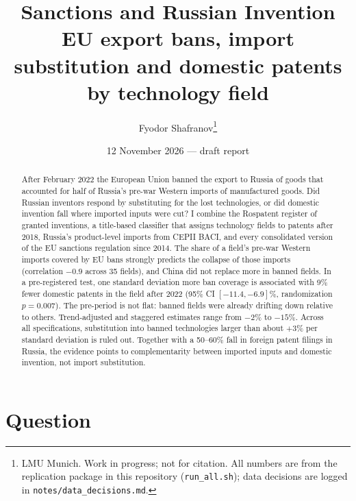 \documentclass[11pt,a4paper]{article}
\title{\textbf{Sanctions and Russian Invention}\\[0.3em]
\large EU export bans, import substitution and domestic patents by technology field}
\author{Fyodor Shafranov\thanks{LMU Munich. Work in progress; not for citation. All numbers are from the
replication package in this repository (\texttt{run\_all.sh}); data decisions are logged in
\texttt{notes/data\_decisions.md}.}}
\date{12 November 2026 --- draft report}
\begin{document}
\maketitle

\begin{abstract}
\noindent
After February 2022 the European Union banned the export to Russia of goods that accounted for half of Russia's
pre-war Western imports of manufactured goods. Did Russian inventors respond by substituting for the lost
technologies, or did domestic invention fall where imported inputs were cut? I combine the Rospatent register of
granted inventions, a title-based classifier that assigns technology fields to patents after 2018, Russia's
product-level imports from CEPII BACI, and every consolidated version of the EU sanctions regulation since 2014.
The share of a field's pre-war Western imports covered by EU bans strongly predicts the collapse of those imports
(correlation $-0.9$ across 35 fields), and China did not replace more in banned fields. In a pre-registered test,
one standard deviation more ban coverage is associated with 9\% fewer domestic patents in the field after 2022
(95\% CI $[-11.4, -6.9]$\%, randomization $p=0.007$). The pre-period is not flat: banned fields were already
drifting down relative to others. Trend-adjusted and staggered estimates range from $-2$\% to $-15$\%. Across all
specifications, substitution into banned technologies larger than about $+3$\% per standard deviation is ruled
out. Together with a 50--60\% fall in foreign patent filings in Russia, the evidence points to complementarity
between imported inputs and domestic invention, not import substitution.
\end{abstract}

\section{Question}
\end{document}
